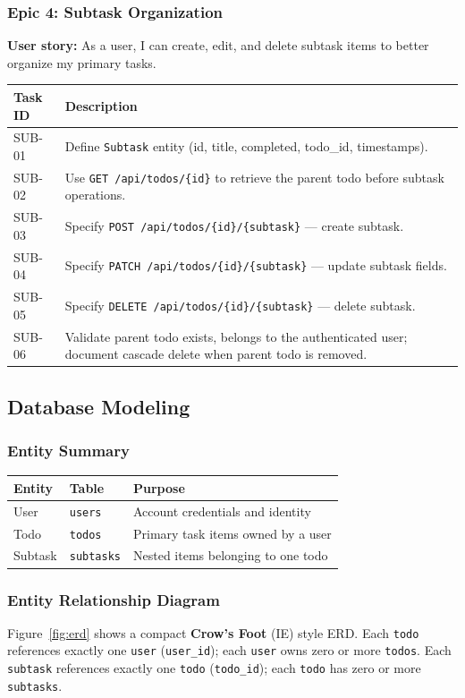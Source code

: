 \subsubsection{Epic 4: Subtask Organization}
\textbf{User story:} As a user, I can create, edit, and delete subtask items to better organize my primary tasks.

\begin{tabularx}{\textwidth}{@{} p{2.4cm} X @{}}
\toprule
\textbf{Task ID} & \textbf{Description} \\
\midrule
SUB-01 & Define \texttt{Subtask} entity (id, title, completed, todo\_id, timestamps). \\
SUB-02 & Use \texttt{GET /api/todos/\{id\}} to retrieve the parent todo before subtask operations. \\
SUB-03 & Specify \texttt{POST /api/todos/\{id\}/\{subtask\}} --- create subtask. \\
SUB-04 & Specify \texttt{PATCH /api/todos/\{id\}/\{subtask\}} --- update subtask fields. \\
SUB-05 & Specify \texttt{DELETE /api/todos/\{id\}/\{subtask\}} --- delete subtask. \\
SUB-06 & Validate parent todo exists, belongs to the authenticated user; document cascade delete when parent todo is removed. \\
\bottomrule
\end{tabularx}

\newpage
\subsection{Database Modeling}\label{sec:database}

\subsubsection{Entity Summary}
\begin{tabularx}{\textwidth}{@{} l l X @{}}
\toprule
\textbf{Entity} & \textbf{Table} & \textbf{Purpose} \\
\midrule
User    & \texttt{users}    & Account credentials and identity \\
Todo    & \texttt{todos}    & Primary task items owned by a user \\
Subtask & \texttt{subtasks} & Nested items belonging to one todo \\
\bottomrule
\end{tabularx}

\subsubsection{Entity Relationship Diagram}
Figure~\ref{fig:erd} shows a compact \textbf{Crow's Foot} (IE) style ERD.
Each \texttt{todo} references exactly one \texttt{user} (\texttt{user\_id});
each \texttt{user} owns zero or more \texttt{todos}.
Each \texttt{subtask} references exactly one \texttt{todo} (\texttt{todo\_id});
each \texttt{todo} has zero or more \texttt{subtasks}.

